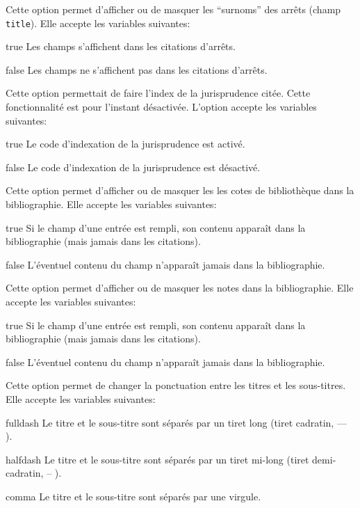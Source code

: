 \documentclass[a4paper]{ltxdockit}[2011/03/25]
\newcommand{\GM}{\enquote}
\begin{document}
\begin{optionlist}
\bigskip
{}\label{jstitles}
Cette option permet d'afficher ou de masquer les \GM{surnoms} des arrêts (champ \texttt{title}). Elle accepte les variables suivantes:
\begin{valuelist}
\item[true] Les champs  s'affichent dans les citations d'arrêts.
\item[false] Les champs  ne s'affichent pas dans les citations d'arrêts.
\end{valuelist}

\bigskip
{}\label{jurisdictionindex}
Cette option permettait de faire l'index de la jurisprudence citée. Cette fonctionnalité est pour l'instant désactivée. L'option accepte les variables suivantes:
\begin{valuelist}
\item[true] Le code d'indexation de la jurisprudence est activé.
\item[false]  Le code d'indexation de la jurisprudence est désactivé.
\end{valuelist}

\bigskip
{}\label{optlibrary}
Cette option permet d'afficher ou de masquer les les cotes de bibliothèque dans la bibliographie. Elle accepte les variables suivantes:
\begin{valuelist}
\item[true] Si le champ  d'une entrée est rempli, son contenu apparaît dans la bibliographie (mais jamais dans les citations).
\item[false] L'éventuel contenu du champ  n'apparaît jamais dans la bibliographie.
\end{valuelist}

\bigskip
{}\label{notes}
Cette option permet d'afficher ou de masquer les notes dans la bibliographie. Elle accepte les variables suivantes:
\begin{valuelist}
\item[true] Si le champ  d'une entrée est rempli, son contenu apparaît dans la bibliographie (mais jamais dans les citations).
\item[false] L'éventuel contenu du champ  n'apparaît jamais dans la bibliographie.
\end{valuelist}

\bigskip
{}\label{punctsubtitle}
Cette option permet de changer la ponctuation entre les titres et les sous-titres. Elle accepte les variables suivantes:
\begin{valuelist}
\item[fulldash] Le titre et le sous-titre sont séparés par un tiret long (tiret cadratin, --- ).
\item[halfdash] Le titre et le sous-titre sont séparés par un tiret mi-long (tiret demi-cadratin, -- ).
\item[comma] Le titre et le sous-titre sont séparés par une virgule.
\end{valuelist}


\end{optionlist}
\end{document}
